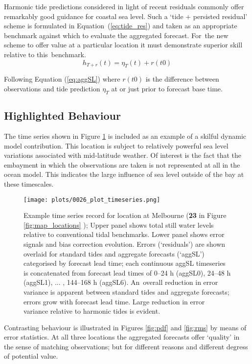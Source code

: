 \documentclass[jmse,article,accept,moreauthors,pdftex,10pt,a4paper]{mdpi}
\begin{document}
Harmonic tide predictions considered in light of recent residuals commonly offer remarkably good guidance for coastal sea level.
Such a `tide + persisted residual' scheme is formulated in Equation~(\ref{eq:tide_res}) and taken as an appropriate benchmark against which to evaluate the aggregated forecast.
For~the new scheme to offer value at a particular location it must demonstrate superior skill relative to this~benchmark.  
\begin{equation}
h_{T+r}(t) = \eta_{T}(t) + r(t0)
\label{eq:tide_res}
\end{equation}

Following Equation (\ref{eq:aggSL}) where $r(t0)$ is the difference between observations and tide prediction $\eta_{T}$ at or just prior to forecast base time. 

\subsection{Highlighted Behaviour}
The time series shown in Figure \ref{fig:ts_melb} is included as an example of a skilful dynamic model contribution.  
This location is subject to relatively powerful sea level variations associated with mid-latitude weather.
Of interest is the fact that the embayment in which the observations are taken is not represented at all in the ocean model.  This indicates the large influence of sea level outside of the bay at these timescales. 

\begin{figure}[H]
    \centering
    \texttt{[image: plots/0026\_plot\_timeseries.png]}
    \caption{ Example time series record for location at Melbourne (\textbf{23} in Figure \ref{fig:map_locations} ); Upper panel shows total still water levels relative to conventional tidal benchmarks. Lower panel shows error signals and bias correction evolution.  Errors (`residuals') are shown overlaid for standard tides and aggregate forecasts (`aggSL') categorised by forecast lead time;  each continuous aggSL timeseries is concatenated from forecast lead times of 0--24 h (aggSL0), 24--48 h (aggSL1), ... , 144--168 h (aggSL6).  An~overall reduction in error variance is apparent between standard tides and aggregate forecasts; errors grow with forecast lead time.   
    Large reduction in error variance relative to harmonic tides is evident.}
\label{fig:ts_melb}
\end{figure}   


Contrasting behaviour is illustrated in Figures \ref{fig:pdf} and \ref{fig:rms} by means of error statistics.
At all three locations the aggregated forecasts offer `quality' in the sense of matching observations; but for different reasons and different degress of potential value. 
\end{document}

